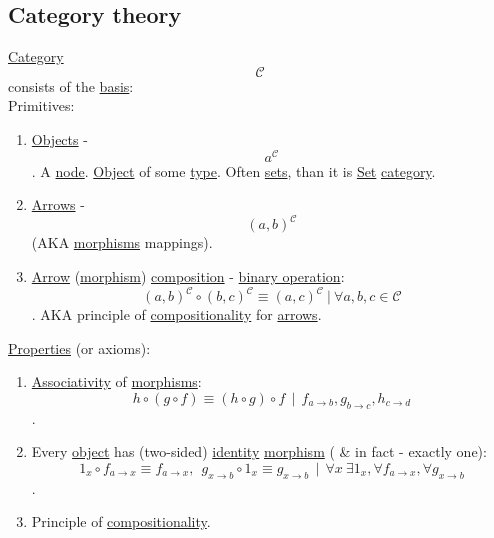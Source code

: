 \documentclass[11pt]{article}
\begin{document}
\subsection{\label{orgca572be}Category theory}
\label{sec:orgf0fca7f}
\hyperref[org0450535]{Category} $$ \mathcal{C} $$ consists of the \hyperref[org27d3d18]{basis}:\\

Primitives:\\
\begin{enumerate}
\item \hyperref[org363acc2]{Objects} - $$ a^{\mathcal{C}} $$. A \hyperref[org60b23d6]{node}. \hyperref[org4be0e9d]{Object} of some \hyperref[orgc4aea2f]{type}. Often \hyperref[org58ec608]{sets}, than it is \hyperref[org1faf06d]{Set} \hyperref[org0450535]{category}.\\
\item \hyperref[org9c45dc6]{Arrows} - $$ {(a,b)}^{\mathcal{C}} $$ (AKA \hyperref[org6c2fa5c]{morphisms} mappings).\\
\item \hyperref[org03967f4]{Arrow} (\hyperref[org5de09d4]{morphism}) \hyperref[orga128e7f]{composition} - \hyperref[orga030476]{binary operation}: $$ {(a, b)}^{\mathcal{C}} \circ {(b, c)}^{\mathcal{C}} \equiv {(a, c)}^{\mathcal{C}} \ | \ \forall a, b, c \in \mathcal{C} $$. AKA principle of \hyperref[orgd6cba3d]{compositionality} for \hyperref[org9c45dc6]{arrows}.\\
\end{enumerate}

\hyperref[org85fb3a1]{Properties} (or axioms):\\
\begin{enumerate}
\item \hyperref[org488de22]{Associativity} of \hyperref[org6c2fa5c]{morphisms}: $$ {h} \circ ({g} \circ {f}) \equiv ({h} \circ {g}) \circ {f} \ \ | \ \ {f}_{a \to b}, {g}_{b \to c}, {h}_{c \to d} $$.\\
\item Every \hyperref[org4be0e9d]{object} has (two-sided) \hyperref[org9b95fd5]{identity} \hyperref[org5de09d4]{morphism} ( \& in fact - exactly one): $$ {1}_x \circ {f}_{a \to x} \equiv {f}_{a \to x}, \ \ {g}_{x \to b} \circ {1_x} \equiv {g}_{x \to b } \ \ | \ \ \forall x \ \exists {1}_{x}, \forall {f}_{a \to x},  \forall {g}_{x \to b} $$.\\
\item Principle of \hyperref[orgd6cba3d]{compositionality}.\\
\end{enumerate}
\end{document}
